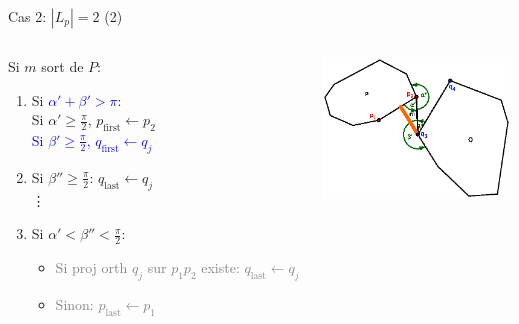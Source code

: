 \documentclass{beamer}
\begin{document}
\begin{frame}{Cas 2: $|L_p| = 2$ (2)}
	\begin{columns}[c]
	\begin{column}[T]{.5\textwidth}
		Si $m$ sort de $P$:
		\begin{enumerate}
		\item Si \textcolor{blue}{$\alpha' + \beta' > \pi$}: \\
			\hspace{0.3cm} Si $\alpha' \geq \frac{\pi}{2}$, $p_{\text{first}} \leftarrow p_{2}$\\
			\hspace{0.3cm} \textcolor{blue}{Si $\beta' \geq \frac{\pi}{2}$, $q_{\text{first}} \leftarrow q_{j}$}
		\item Si $\beta'' \geq \frac{\pi}{2}$: $q_{\text{last}} \leftarrow q_{j}$ \\ 
			\hspace{0.5cm} \vdots
		\item Si $\alpha' < \beta'' < \frac{\pi}{2}$:
			\begin{itemize}
			\item \textcolor{gray}{Si proj orth $q_{j}$ sur $p_{1}p_{2}$ existe: $q_{\text{last}} \leftarrow q_{j}$}
			\item \textcolor{gray}{Sinon: $p_{\text{last}} \leftarrow p_{\text{1}}$}
			\end{itemize}
		\end{enumerate}
	\end{column}
	\begin{column}[T]{.5\textwidth}
		\includegraphics[width=5cm]{dmin2_7.eps}
	\end{column}
	\end{columns}
\end{frame}
\end{document}
